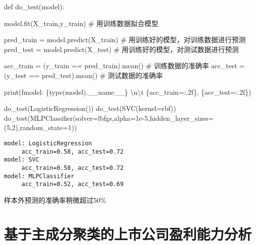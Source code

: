 \documentclass[
  letterpaper,
  DIV=11,
  numbers=noendperiod]{scrreprt}
\newenvironment{Shaded}{\begin{snugshade}}{\end{snugshade}}
\newcommand{\BuiltInTok}[1]{\textcolor[rgb]{0.00,0.23,0.31}{#1}}
\newcommand{\CharTok}[1]{\textcolor[rgb]{0.13,0.47,0.30}{#1}}
\newcommand{\CommentTok}[1]{\textcolor[rgb]{0.37,0.37,0.37}{#1}}
\newcommand{\DecValTok}[1]{\textcolor[rgb]{0.68,0.00,0.00}{#1}}
\newcommand{\FloatTok}[1]{\textcolor[rgb]{0.68,0.00,0.00}{#1}}
\newcommand{\KeywordTok}[1]{\textcolor[rgb]{0.00,0.23,0.31}{#1}}
\newcommand{\NormalTok}[1]{\textcolor[rgb]{0.00,0.23,0.31}{#1}}
\newcommand{\OperatorTok}[1]{\textcolor[rgb]{0.37,0.37,0.37}{#1}}
\newcommand{\SpecialCharTok}[1]{\textcolor[rgb]{0.37,0.37,0.37}{#1}}
\newcommand{\SpecialStringTok}[1]{\textcolor[rgb]{0.13,0.47,0.30}{#1}}
\newcommand{\StringTok}[1]{\textcolor[rgb]{0.13,0.47,0.30}{#1}}
\newcommand{\VariableTok}[1]{\textcolor[rgb]{0.07,0.07,0.07}{#1}}
\begin{document}
\begin{Shaded}
\begin{Highlighting}[]
\KeywordTok{def}\NormalTok{ do\_test(model):}
    
\NormalTok{    model.fit(X\_train,y\_train) }\CommentTok{\# 用训练数据拟合模型}

\NormalTok{    pred\_train }\OperatorTok{=}\NormalTok{ model.predict(X\_train) }\CommentTok{\# 用训练好的模型，对训练数据进行预测}
\NormalTok{    pred\_test }\OperatorTok{=}\NormalTok{ model.predict(X\_test) }\CommentTok{\# 用训练好的模型，对测试数据进行预测}

\NormalTok{    acc\_train }\OperatorTok{=}\NormalTok{ (y\_train }\OperatorTok{==}\NormalTok{ pred\_train).mean() }\CommentTok{\# 训练数据的准确率}
\NormalTok{    acc\_test }\OperatorTok{=}\NormalTok{ (y\_test }\OperatorTok{==}\NormalTok{ pred\_test).mean() }\CommentTok{\# 测试数据的准确率}

    \BuiltInTok{print}\NormalTok{(}\SpecialStringTok{f\textquotesingle{}model: }\SpecialCharTok{\{}\BuiltInTok{type}\NormalTok{(model)}\SpecialCharTok{.}\VariableTok{\_\_name\_\_}\SpecialCharTok{\}}\SpecialStringTok{ }\CharTok{\textbackslash{}n\textbackslash{}t}\SpecialStringTok{ }\SpecialCharTok{\{}\NormalTok{acc\_train}\OperatorTok{=}\SpecialCharTok{:.2f\}}\SpecialStringTok{, }\SpecialCharTok{\{}\NormalTok{acc\_test}\OperatorTok{=}\SpecialCharTok{:.2f\}}\SpecialStringTok{\textquotesingle{}}\NormalTok{)}


\NormalTok{do\_test(LogisticRegression())}
\NormalTok{do\_test(SVC(kernel}\OperatorTok{=}\StringTok{\textquotesingle{}rbf\textquotesingle{}}\NormalTok{))}
\NormalTok{do\_test(MLPClassifier(solver}\OperatorTok{=}\StringTok{\textquotesingle{}lbfgs\textquotesingle{}}\NormalTok{,alpha}\OperatorTok{=}\FloatTok{1e{-}5}\NormalTok{,hidden\_layer\_sizes}\OperatorTok{=}\NormalTok{(}\DecValTok{5}\NormalTok{,}\DecValTok{2}\NormalTok{),random\_state}\OperatorTok{=}\DecValTok{1}\NormalTok{))}
\end{Highlighting}
\end{Shaded}

\begin{verbatim}
model: LogisticRegression 
     acc_train=0.58, acc_test=0.72
model: SVC 
     acc_train=0.58, acc_test=0.72
model: MLPClassifier 
     acc_train=0.52, acc_test=0.69
\end{verbatim}

样本外预测的准确率稍微超过50\%

\hypertarget{ux57faux4e8eux4e3bux6210ux5206ux805aux7c7bux7684ux4e0aux5e02ux516cux53f8ux76c8ux5229ux80fdux529bux5206ux6790}{%
\section{基于主成分聚类的上市公司盈利能力分析}\label{ux57faux4e8eux4e3bux6210ux5206ux805aux7c7bux7684ux4e0aux5e02ux516cux53f8ux76c8ux5229ux80fdux529bux5206ux6790}}
\end{document}
